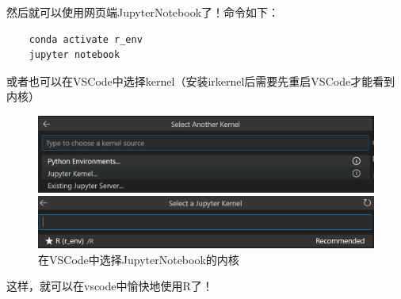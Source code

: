 然后就可以使用网页端JupyterNotebook了！命令如下：
\begin{lstlisting}
    conda activate r_env
    jupyter notebook
\end{lstlisting}

或者也可以在VSCode中选择kernel（安装irkernel后需要先重启VSCode才能看到内核）

\begin{figure}[ht]
    \centering
    \begin{minipage}[c]{0.9\textwidth}
        \centering
        \includegraphics[width=13cm]{image/env/jupyter-list.png}
    \end{minipage}

    \begin{minipage}[c]{0.9\textwidth}
        \centering
        \includegraphics[width=13cm]{image/env/jupyter-r-list.png}
    \end{minipage}
    \caption{在VSCode中选择JupyterNotebook的内核}
\end{figure}

这样，就可以在vscode中愉快地使用R了！